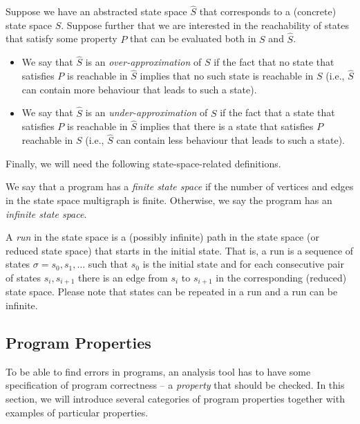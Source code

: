\begin{definition}
  Suppose we have an abstracted state space $\widehat{S}$ that corresponds to a (concrete) state space $S$.
  Suppose further that we are interested in the reachability of states that satisfy some property $P$ that can be evaluated both in $S$ and $\widehat{S}$.
  \begin{itemize}
    \item We say that $\widehat{S}$ is an \emph{over-approximation} of $S$ if the fact that no state that satisfies $P$ is reachable in $\widehat{S}$ implies that no such state is reachable in $S$ (i.e., $\widehat{S}$ can contain more behaviour that leads to such a state).
    \item We say that $\widehat{S}$ is an \emph{under-approximation} of $S$ if the fact that a state that satisfies $P$ is reachable in $\widehat{S}$ implies that there is a state that satisfies $P$ reachable in $S$ (i.e., $\widehat{S}$ can contain less behaviour that leads to such a state).
    \end{itemize}
\end{definition}

Finally, we will need the following state-space-related definitions.

\begin{definition}
We say that a program has a \emph{finite state space} if the number of vertices and edges in the state space multigraph is finite.
Otherwise, we say the program has an \emph{infinite state space}.
\end{definition}

\begin{definition}[Run]
A \emph{run} in the state space is a (possibly infinite) path in the state space (or reduced state space) that starts in the initial state.
That is, a run is a sequence of states $\sigma = s_0, s_1, …$ such that $s_0$ is the initial state and for each consecutive pair of states $s_i, s_{i+1}$ there is an edge from $s_i$ to $s_{i + 1}$ in the corresponding (reduced) state space.
Please note that states can be repeated in a run and a run can be infinite.
\end{definition}

\subsection{Program Properties}

To be able to find errors in programs, an analysis tool has to have
some specification of program correctness -- a \emph{property} that should be
checked.
In this section, we will introduce several categories of program properties
together with examples of particular properties.

